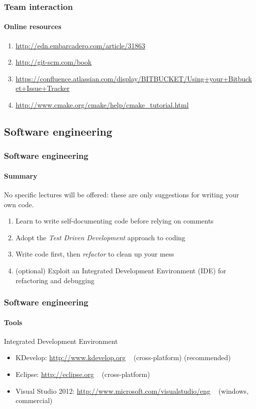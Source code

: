 \begin{frame}
\frametitle{Team interaction}
\framesubtitle{Online resources}
\begin{enumerate}
\item \url{http://edn.embarcadero.com/article/31863}
\item \url{http://git-scm.com/book}
\item \url{https://confluence.atlassian.com/display/BITBUCKET/Using+your+Bitbucket+Issue+Tracker}
\item \url{http://www.cmake.org/cmake/help/cmake_tutorial.html}
\end{enumerate}
\end{frame}

\subsection{Software engineering}

\begin{frame}
\frametitle{Software engineering}
\framesubtitle{Summary}
No specific lectures will be offered: these are only suggestions for writing your own code. 
\begin{enumerate}
\item Learn to write self-documenting code before relying on comments
\item Adopt the {\em Test Driven Development} approach to coding
\item Write code first, then {\em refactor} to clean up your mess
\item (optional) Exploit an Integrated Development Environment (IDE) for refactoring and debugging
\end{enumerate}

\end{frame}

\begin{frame}
\frametitle{Software engineering}
\framesubtitle{Tools}
\begin{block}{Integrated Development Environment}
\begin{itemize}
\item KDevelop: \url{http://www.kdevelop.org} \,\,\, (cross-platform) (recommended)
\item Eclipse: \url{http://eclipse.org} \,\,\, (cross-platform)
\item Visual Studio 2012: \url{http://www.microsoft.com/visualstudio/eng} \,\,\, (windows, commercial)
\end{itemize}
\end{block}
\end{frame}

